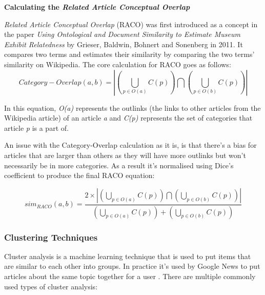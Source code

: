 \documentclass[12pt]{article}
\begin{document}
\textbf{Calculating the \emph{Related Article Conceptual Overlap} }

\label{RACOcalculation}

\emph{Related Article Conceptual Overlap } (RACO) was first introduced as a concept in the paper \emph{Using Ontological and Document Similarity to Estimate Museum Exhibit Relatedness} \cite{racoCalculation} by Grieser, Baldwin, Bohnert and Sonenberg in 2011. It compares two terms and estimates their similarity by comparing the two terms' similarity on Wikipedia. The core calculation for RACO goes as follows: 
\[Category-Overlap(a,b) = \left|
\left(\bigcup_{p \in O(a)} C(p)\right) \bigcap \left(\bigcup_{p \in O(b)} C(p)\right)\right|
\]

In this equation, \emph{O(a)} represents the outlinks (the links to other articles from the Wikipedia article) of an article \emph{a} and \emph{C(p)} represents the set of categories that article \emph{p} is a part of.

An issue with the Category-Overlap calculation as it is, is that there's a bias for articles that are larger than others as they will have more outlinks but won't necessarily be in more categories. As a result it's normalised using Dice's coefficient  to produce the final RACO equation:

\[sim_{RACO}(a,b) = \frac{2 \times \left|
\left(\bigcup_{p \in O(a)} C(p)\right) \bigcap \left(\bigcup_{p \in O(b)} C(p)\right)\right|}
{\left(\bigcup_{p \in O(a)} C(p)\right) + \left(\bigcup_{p \in O(b)} C(p)\right)}
\]

\label{TopicLabelingTechniques}

\subsubsection{Clustering Techniques}

\label{ClusteringTechniques}

Cluster analysis is a machine learning technique that is used to put items that are similar to each other into groups. In practice it's used by Google News \cite{googleNews} to put articles about the same topic together for a user \cite{googleClustering}. There are multiple commonly used types of cluster analysis: \\
\end{document}
